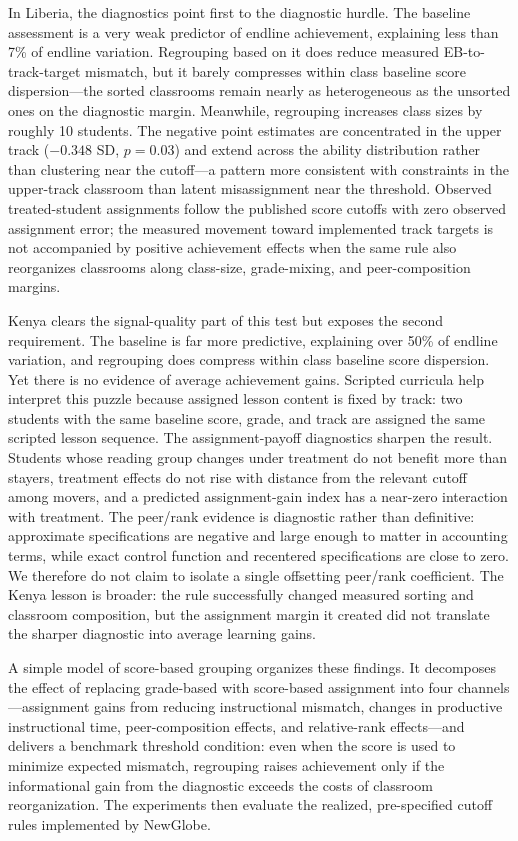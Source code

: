 \documentclass[11pt]{article}
\begin{document}
In Liberia, the diagnostics point first to the diagnostic hurdle. The baseline assessment is a very weak predictor of endline achievement, explaining less than 7\% of endline variation. Regrouping based on it does reduce measured EB-to-track-target mismatch, but it barely compresses within class baseline score dispersion---the sorted classrooms remain nearly as heterogeneous as the unsorted ones on the diagnostic margin. Meanwhile, regrouping increases class sizes by roughly 10 students. The negative point estimates are concentrated in the upper track ($-0.348$ SD, $p = 0.03$) and extend across the ability distribution rather than clustering near the cutoff---a pattern more consistent with constraints in the upper-track classroom than latent misassignment near the threshold. Observed treated-student assignments follow the published score cutoffs with zero observed assignment error; the measured movement toward implemented track targets is not accompanied by positive achievement effects when the same rule also reorganizes classrooms along class-size, grade-mixing, and peer-composition margins.

Kenya clears the signal-quality part of this test but exposes the second requirement. The baseline is far more predictive, explaining over 50\% of endline variation, and regrouping does compress within class baseline score dispersion. Yet there is no evidence of average achievement gains. Scripted curricula help interpret this puzzle because assigned lesson content is fixed by track: two students with the same baseline score, grade, and track are assigned the same scripted lesson sequence. The assignment-payoff diagnostics sharpen the result. Students whose reading group changes under treatment do not benefit more than stayers, treatment effects do not rise with distance from the relevant cutoff among movers, and a predicted assignment-gain index has a near-zero interaction with treatment. The peer/rank evidence is diagnostic rather than definitive: approximate specifications are negative and large enough to matter in accounting terms, while exact control function and recentered specifications are close to zero. We therefore do not claim to isolate a single offsetting peer/rank coefficient. The Kenya lesson is broader: the rule successfully changed measured sorting and classroom composition, but the assignment margin it created did not translate the sharper diagnostic into average learning gains.

A simple model of score-based grouping organizes these findings. It decomposes the effect of replacing grade-based with score-based assignment into four channels---assignment gains from reducing instructional mismatch, changes in productive instructional time, peer-composition effects, and relative-rank effects---and delivers a benchmark threshold condition: even when the score is used to minimize expected mismatch, regrouping raises achievement only if the informational gain from the diagnostic exceeds the costs of classroom reorganization. The experiments then evaluate the realized, pre-specified cutoff rules implemented by NewGlobe.
\end{document}
